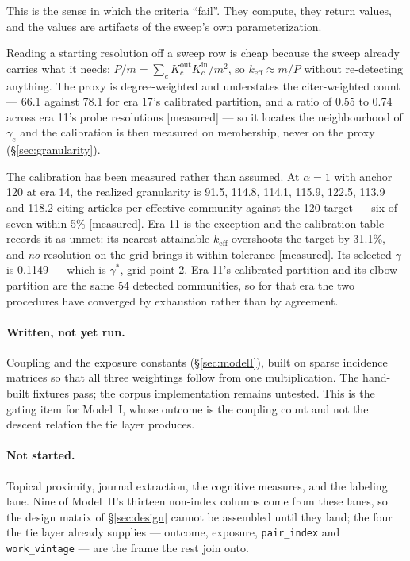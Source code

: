 \documentclass[11pt]{article}
\newcommand{\meas}{{\footnotesize\textsf{[measured]}}}
\newcommand{\code}[1]{\texttt{\small #1}}
\begin{document}
This is the sense in which the criteria ``fail''. They compute, they return values, and the
values are artifacts of the sweep's own parameterization.

Reading a starting resolution off a sweep row is cheap because the sweep already carries what
it needs: $P/m = \sum_c K^{\mathrm{out}}_c K^{\mathrm{in}}_c / m^2$, so $k_{\mathrm{eff}}
\approx m/P$ without re-detecting anything. The proxy is degree-weighted and understates the
citer-weighted count --- 66.1 against 78.1 for era 17's calibrated partition, and a ratio of
0.55 to 0.74 across era 11's probe resolutions \meas{} --- so it locates the neighbourhood of
$\gamma_e$ and the calibration is then measured on membership, never on the proxy
(\S\ref{sec:granularity}).

The calibration has been measured rather than assumed. At $\alpha = 1$ with anchor 120 at
era 14, the realized granularity is 91.5, 114.8, 114.1, 115.9, 122.5, 113.9 and 118.2 citing
articles per effective community against the 120 target --- six of seven within 5\%
\meas{}. Era 11 is the exception and the calibration table records it as unmet: its nearest
attainable $k_{\mathrm{eff}}$ overshoots the target by 31.1\%, and \emph{no} resolution on
the grid brings it within tolerance \meas{}. Its selected $\gamma$ is 0.1149 --- which is
$\gamma^{*}$, grid point 2. Era 11's calibrated partition and its elbow partition are the
same 54 detected communities, so for that era the two procedures have converged by
exhaustion rather than by agreement.

\paragraph{Written, not yet run.} Coupling and the exposure constants
(\S\ref{sec:modelI}), built on sparse incidence matrices so that all three weightings follow
from one multiplication. The hand-built fixtures pass; the corpus implementation remains
untested. This is the gating item for Model~I, whose outcome is the coupling count and not
the descent relation the tie layer produces.

\paragraph{Not started.} Topical proximity, journal extraction, the cognitive measures, and
the labeling lane. Nine of Model~II's thirteen non-index columns come from these lanes, so
the design matrix of \S\ref{sec:design} cannot be assembled until they land; the four the
tie layer already supplies --- outcome, exposure, \code{pair\_index} and \code{work\_vintage}
--- are the frame the rest join onto.
\end{document}
